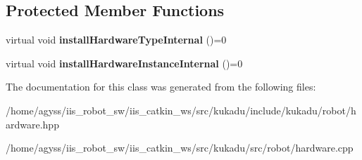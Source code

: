 \subsection*{Protected Member Functions}
\begin{DoxyCompactItemize}
\item 
virtual void {\bfseries install\+Hardware\+Type\+Internal} ()=0\hypertarget{classkukadu_1_1Hardware_af353cdce2e2bb25ec341374a30b6b85a}{}\label{classkukadu_1_1Hardware_af353cdce2e2bb25ec341374a30b6b85a}

\item 
virtual void {\bfseries install\+Hardware\+Instance\+Internal} ()=0\hypertarget{classkukadu_1_1Hardware_a2636d7484a9435d8131fcf4ddff36fed}{}\label{classkukadu_1_1Hardware_a2636d7484a9435d8131fcf4ddff36fed}

\end{DoxyCompactItemize}


The documentation for this class was generated from the following files\+:\begin{DoxyCompactItemize}
\item 
/home/agyss/iis\+\_\+robot\+\_\+sw/iis\+\_\+catkin\+\_\+ws/src/kukadu/include/kukadu/robot/hardware.\+hpp\item 
/home/agyss/iis\+\_\+robot\+\_\+sw/iis\+\_\+catkin\+\_\+ws/src/kukadu/src/robot/hardware.\+cpp\end{DoxyCompactItemize}
